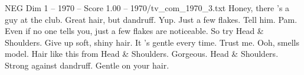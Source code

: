 \begin{textsample}{NEG Dim 1 – 1970 – Score 1.00 – 1970/tv\_com\_1970\_3.txt}  \label{ex:f1_neg_064}
Honey, there 's a guy at the club.
Great hair, but dandruff.
Yup.
Just a few flakes.
Tell him.
Pam.
Even if no one tells you, just a few flakes are noticeable.
So try Head \& Shoulders.
Give up soft, shiny hair.
It 's gentle every time.
Trust me.
Ooh, smells model.
Hair like this from Head \& Shoulders.
Gorgeous.
Head \& Shoulders.
Strong against dandruff.
Gentle on your hair.

\end{textsample}
